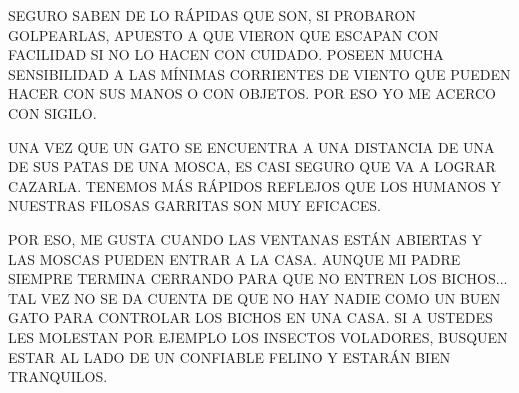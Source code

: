 SEGURO SABEN DE LO RÁPIDAS QUE SON, SI PROBARON GOLPEARLAS, APUESTO A QUE VIERON QUE ESCAPAN CON FACILIDAD SI NO LO HACEN CON CUIDADO. POSEEN MUCHA SENSIBILIDAD A LAS MÍNIMAS CORRIENTES DE VIENTO QUE PUEDEN HACER CON SUS MANOS O CON OBJETOS. POR ESO YO ME ACERCO CON SIGILO.	 





\newpage
{}
\newpage
{}

UNA VEZ QUE UN GATO SE ENCUENTRA A UNA DISTANCIA DE UNA DE SUS PATAS DE UNA MOSCA, ES CASI SEGURO QUE VA A LOGRAR CAZARLA. TENEMOS MÁS RÁPIDOS REFLEJOS QUE LOS HUMANOS Y NUESTRAS FILOSAS GARRITAS SON MUY EFICACES. 

POR ESO, ME GUSTA CUANDO LAS VENTANAS ESTÁN ABIERTAS Y LAS MOSCAS PUEDEN ENTRAR A LA CASA. AUNQUE MI PADRE SIEMPRE TERMINA CERRANDO PARA QUE NO ENTREN LOS BICHOS$\ldots$ TAL VEZ NO SE DA CUENTA DE QUE NO HAY NADIE COMO UN BUEN GATO PARA CONTROLAR LOS BICHOS EN UNA CASA. SI A USTEDES LES MOLESTAN POR EJEMPLO LOS INSECTOS VOLADORES, BUSQUEN ESTAR AL LADO DE UN CONFIABLE FELINO Y ESTARÁN BIEN TRANQUILOS.	 
